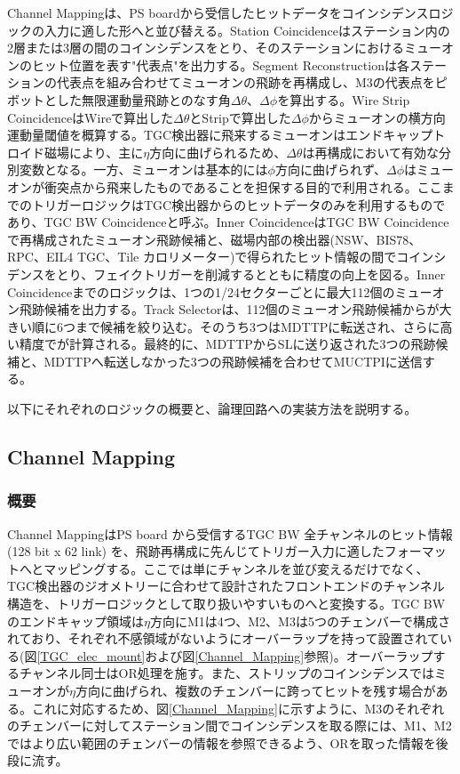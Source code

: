 Channel Mappingは、PS boardから受信したヒットデータをコインシデンスロジックの入力に適した形へと並び替える。Station Coincidenceはステーション内の2層または3層の間のコインシデンスをとり、そのステーションにおけるミューオンのヒット位置を表す"代表点"を出力する。Segment Reconstructionは各ステーションの代表点を組み合わせてミューオンの飛跡を再構成し、M3の代表点をピボットとした無限運動量飛跡とのなす角$\Delta\theta$、$\Delta\phi$を算出する。Wire Strip CoincidenceはWireで算出した$\Delta\theta$とStripで算出した$\Delta\phi$からミューオンの横方向運動量閾値\pt を概算する。TGC検出器に飛来するミューオンはエンドキャップトロイド磁場により、主に$\eta$方向に曲げられるため、$\Delta\theta$は\pt 再構成において有効な分別変数となる。一方、ミューオンは基本的には$\phi$方向に曲げられず、$\Delta\phi$はミューオンが衝突点から飛来したものであることを担保する目的で利用される。ここまでのトリガーロジックはTGC検出器からのヒットデータのみを利用するものであり、TGC BW Coincidenceと呼ぶ。Inner CoincidenceはTGC BW Coincidenceで再構成されたミューオン飛跡候補と、磁場内部の検出器(NSW、BIS78、RPC、EIL4 TGC、Tile カロリメーター)で得られたヒット情報の間でコインシデンスをとり、フェイクトリガーを削減するとともに\pt 精度の向上を図る。Inner Coincidenceまでのロジックは、1つの1/24セクターごとに最大112個のミューオン飛跡候補を出力する。Track Selectorは、112個のミューオン飛跡候補から\pt が大きい順に6つまで候補を絞り込む。そのうち3つはMDTTPに転送され、さらに高い精度で\pt が計算される。最終的に、MDTTPからSLに送り返された3つの飛跡候補と、MDTTPへ転送しなかった3つの飛跡候補を合わせてMUCTPIに送信する。


以下にそれぞれのロジックの概要と、論理回路への実装方法を説明する。

\subsection{Channel Mapping}
\subsubsection*{概要}
Channel MappingはPS board から受信するTGC BW 全チャンネルのヒット情報 (128 bit x 62 link) を、飛跡再構成に先んじてトリガー入力に適したフォーマットへとマッピングする。ここでは単にチャンネルを並び変えるだけでなく、TGC検出器のジオメトリーに合わせて設計されたフロントエンドのチャンネル構造を、トリガーロジックとして取り扱いやすいものへと変換する。TGC BW のエンドキャップ領域は$\eta$方向にM1は4つ、M2、M3は5つのチェンバーで構成されており、それぞれ不感領域がないようにオーバーラップを持って設置されている(図\ref{TGC_elec_mount}および図\ref{Channel_Mapping}参照)。オーバーラップするチャンネル同士はOR処理を施す。また、ストリップのコインシデンスではミューオンが$\eta$方向に曲げられ、複数のチェンバーに跨ってヒットを残す場合がある。これに対応するため、図\ref{Channel_Mapping}に示すように、M3のそれぞれのチェンバーに対してステーション間でコインシデンスを取る際には、M1、M2ではより広い範囲のチェンバーの情報を参照できるよう、ORを取った情報を後段に流す。

